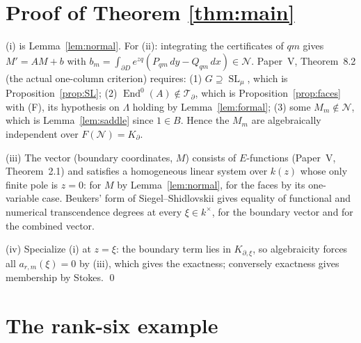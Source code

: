\documentclass[11pt]{article}
\numberwithin{equation}{section}
\theoremstyle{definition}
\theoremstyle{remark}
\newcommand{\SL}{\operatorname{SL}}\newcommand{\GL}{\operatorname{GL}}\newcommand{\PGL}{\operatorname{PGL}}
\newcommand{\End}{\operatorname{End}}\newcommand{\Hom}{\operatorname{Hom}}\newcommand{\Span}{\operatorname{span}}
\newcommand{\Ncal}{\mathcal N}\newcommand{\Tcal}{\mathcal T}\newcommand{\Bcal}{\mathcal B}
\begin{document}
\section{Proof of Theorem \ref{thm:main}}

(i) is Lemma~\ref{lem:normal}. For (ii): integrating the certificates of
$qm$ gives $M'=AM+b$ with $b_m=\int_{\partial D}e^{zq}(P_{qm}\,dy-Q_{qm}\,dx)\in\Ncal$.
Paper~V, Theorem~8.2 (the actual one-column criterion) requires:
(1) $G\supseteq\SL_\mu$, which is Proposition~\ref{prop:SL};
(2) $\End^0(A)\notin\Tcal_\partial$, which is Proposition~\ref{prop:faces}
with (F), its hypothesis on $\Lambda$ holding by Lemma~\ref{lem:formal};
(3) some $M_m\notin\Ncal$, which is Lemma~\ref{lem:saddle} since $1\in B$.
Hence the $M_m$ are algebraically independent over $F(\Ncal)=K_\partial$.

(iii) The vector (boundary coordinates, $M$) consists of $E$-functions
(Paper~V, Theorem~2.1) and satisfies a homogeneous linear system over $k(z)$
whose only finite pole is $z=0$: for $M$ by Lemma~\ref{lem:normal}, for the
faces by its one-variable case. Beukers' form of Siegel--Shidlovskii gives
equality of functional and numerical transcendence degrees at every
$\xi\in k^\times$, for the boundary vector and for the combined vector.

(iv) Specialize (i) at $z=\xi$: the boundary term lies in $K_{\partial,\xi}$,
so algebraicity forces all $a_{r,m}(\xi)=0$ by (iii), which gives the exactness;
conversely exactness gives membership by Stokes. \qed

\section{The rank-six example}\label{sec:example}
\end{document}
